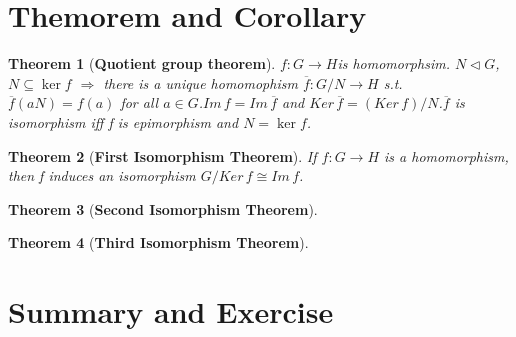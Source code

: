 \documentclass{article}
\theoremstyle{plain}
\newtheorem{thm}{Theorem}[section]
\theoremstyle{definition}
\newcommand{\normal}{\vartriangleleft}%
\begin{document}
\section{Themorem and Corollary}
\begin{thm}[\textbf{Quotient group theorem}]
$f:G\rightarrow H$is homomorphsim. $N\normal G$,$N\subseteq \ker f$ $\Rightarrow$ there is a unique homomophism $\overline{f}:G/N\rightarrow H$ s.t. $\overline{f}(aN)=f(a)$ for all $a\in G$.$Im\,f=Im\,\overline{f}$ and $Ker\,\overline{f}=(Ker\,f)/N$.$\overline{f}$ is isomorphism iff f is epimorphism and $N=\ker f$.\\
\end{thm}
\begin{thm}[\textbf{First Isomorphism Theorem}]
If $f:G\rightarrow H$ is a homomorphism, then f induces an isomorphism $G/Ker\, f\cong Im\, f$.
\end{thm}
\begin{thm}[\textbf{Second Isomorphism Theorem}]

\end{thm}
\begin{thm}[\textbf{Third Isomorphism Theorem}]
\end{thm}
\section{Summary and Exercise}
\end{document}
